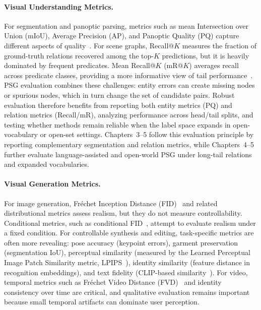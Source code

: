 \paragraph{Visual Understanding Metrics.}
For segmentation and panoptic parsing, metrics such as mean Intersection over Union (mIoU), Average Precision (AP), and Panoptic Quality (PQ) capture different aspects of quality~\citep{kirillov2019panoptic, lin2014microsoft}. For scene graphs, Recall@$K$ measures the fraction of ground-truth relations recovered among the top-$K$ predictions, but it is heavily dominated by frequent predicates. Mean Recall@$K$ (mR@$K$) averages recall across predicate classes, providing a more informative view of tail performance~\citep{zellers2018neural}. PSG evaluation combines these challenges: entity errors can create missing nodes or spurious nodes, which in turn change the set of candidate pairs. Robust evaluation therefore benefits from reporting both entity metrics (PQ) and relation metrics (Recall/mR), analyzing performance across head/tail splits, and testing whether methods remain reliable when the label space expands in open-vocabulary or open-set settings. Chapters~3--5 follow this evaluation principle by reporting complementary segmentation and relation metrics, while Chapters~4--5 further evaluate language-assisted and open-world PSG under long-tail relations and expanded vocabularies.

\paragraph{Visual Generation Metrics.}
For image generation, Fr\'echet Inception Distance (FID)~\citep{heusel2017gans} and related distributional metrics assess realism, but they do not measure controllability. Conditional metrics, such as conditional FID~\citep{soloveitchik2021conditional}, attempt to evaluate realism under a fixed condition. For controllable synthesis and editing, task-specific metrics are often more revealing: pose accuracy (keypoint errors), garment preservation (segmentation IoU), perceptual similarity (measured by the Learned Perceptual Image Patch Similarity metric, LPIPS~\citep{zhang2018unreasonable}), identity similarity (feature distance in recognition embeddings), and text fidelity (CLIP-based similarity~\citep{radford2021learning}). For video, temporal metrics such as Fr\'echet Video Distance (FVD)~\citep{unterthiner2018towards} and identity consistency over time are critical, and qualitative evaluation remains important because small temporal artifacts can dominate user perception.

